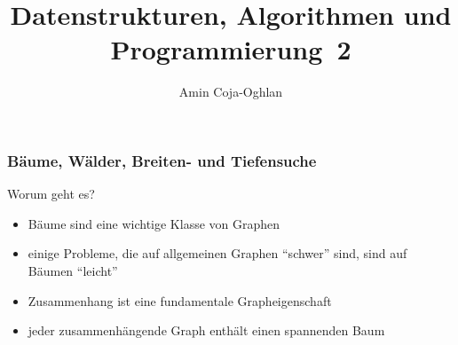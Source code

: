 \documentclass[aspectratio=1610, 11pt]{beamer}
\title{Datenstrukturen, Algorithmen und Programmierung~2}
\author[A.~Coja-Oghlan]{Amin Coja-Oghlan}
\institute[DAP2]{Lehrstuhl Informatik 2\\Fakult\"at f\"ur Informatik}
\newcommand{\mytitle}{B\"aume, W\"alder, Breiten- und Tiefensuche}
\begin{document}
\frame[plain]{\titlepage}

\begin{frame}\frametitle{\mytitle}
	\begin{exampleblock}{Worum geht es?}
		\begin{itemize}
			\item B\"aume sind eine wichtige Klasse von Graphen
			\item einige Probleme, die auf allgemeinen Graphen ``schwer'' sind, sind auf B\"aumen ``leicht''
			\item Zusammenhang ist eine fundamentale Grapheigenschaft
			\item jeder zusammenh\"angende Graph enth\"alt einen spannenden Baum
		\end{itemize}
	\end{exampleblock}
\end{frame}
\end{document}
